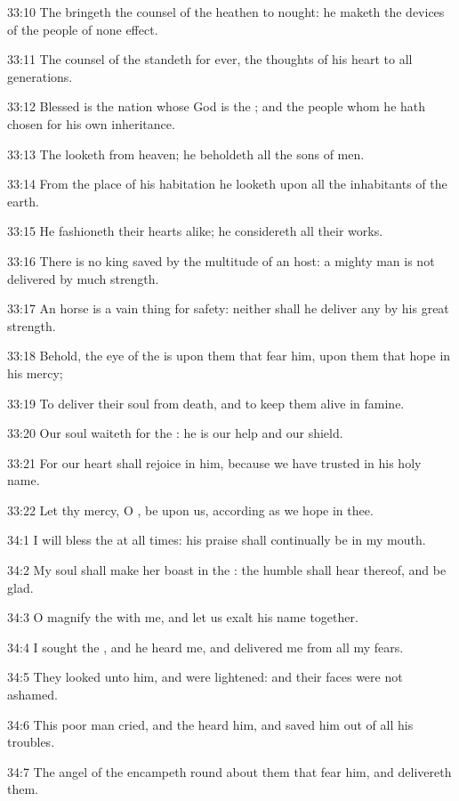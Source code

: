 33:10 The \LORD bringeth the counsel of the heathen to nought: he
maketh the devices of the people of none effect.

33:11 The counsel of the \LORD standeth for ever, the thoughts of his
heart to all generations.

33:12 Blessed is the nation whose God is the \LORD; and the people whom
he hath chosen for his own inheritance.

33:13 The \LORD looketh from heaven; he beholdeth all the sons of men.

33:14 From the place of his habitation he looketh upon all the
inhabitants of the earth.

33:15 He fashioneth their hearts alike; he considereth all their
works.

33:16 There is no king saved by the multitude of an host: a mighty man
is not delivered by much strength.

33:17 An horse is a vain thing for safety: neither shall he deliver
any by his great strength.

33:18 Behold, the eye of the \LORD is upon them that fear him, upon
them that hope in his mercy;

33:19 To deliver their soul from death, and to keep them alive in
famine.

33:20 Our soul waiteth for the \LORD: he is our help and our shield.

33:21 For our heart shall rejoice in him, because we have trusted in
his holy name.

33:22 Let thy mercy, O \LORD, be upon us, according as we hope in thee.



34:1 I will bless the \LORD at all times: his praise shall continually
be in my mouth.

34:2 My soul shall make her boast in the \LORD: the humble shall hear
thereof, and be glad.

34:3 O magnify the \LORD with me, and let us exalt his name together.

34:4 I sought the \LORD, and he heard me, and delivered me from all my
fears.

34:5 They looked unto him, and were lightened: and their faces were
not ashamed.

34:6 This poor man cried, and the \LORD heard him, and saved him out of
all his troubles.

34:7 The angel of the \LORD encampeth round about them that fear him,
and delivereth them.

